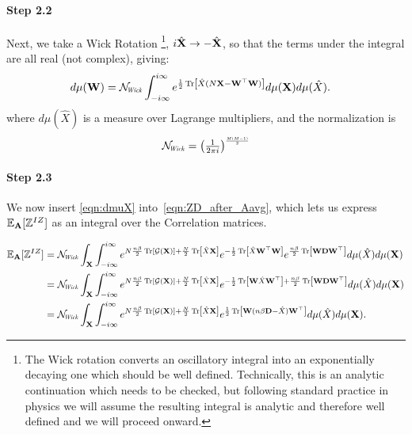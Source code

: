 \paragraph{Step 2.2}
Next, we take a Wick Rotation%
\footnote{The Wick rotation converts an oscillatory integral into an exponentially decaying one which should be well defined.  Technically, this is an analytic continuation which needs to be checked, but following standard practice in physics we will assume the resulting integral is analytic and therefore well defined and we will proceed onward. },
$i\hat{\mathbf{X}}\rightarrow -\hat{\mathbf{X}}$, so that the terms under the integral are all real (not complex), giving:
\begin{align}
  \label{eqn:dmuX}
  d\mu(\mathbf{W}) &= \NWICK\int_{-i\infty}^{i\infty} e^{\frac{1}{2}\Trace{\hat{X}(N\mathbf{X}-\mathbf{W}^{\top}\mathbf{W})}} d\mu(\mathbf{X})d\mu(\hat{X} ).
\end{align}
where $d\mu(\hat{X})$ is a measure over {} Lagrange multipliers, and the normalization is
\begin{equation}
\NWICK = \left(\tfrac{1}{2\pi i}\right)^{\scalebox{0.7}{$\scriptstyle \frac{M(M-1)}{2}$}}
\end{equation}


\paragraph{Step 2.3}
We now insert \ref{eqn:dmuX} into~\ref{eqn:ZD_after_Aavg}, which lets us
express $\mathbb{E}_{\mathbf{A}}[\mathbb{Z}^{IZ}]$ as an integral over the \Teacher Correlation matrices.

\begin{align}
  \nonumber
  \EZDA&=
  \NWICK\int_{\XMAT}  \int_{-i\infty}^{i\infty}
  e^{N\frac{\ND\beta}{2} \Trace{\GFANCY}+\frac{N}{2}\Trace{\hat{X}\mathbf{X}} }
  e^{-\frac{1}{2}\Trace{\hat{X}\mathbf{W}^{\top}\mathbf{W}}}
  e^{\frac{\ND\beta}{2}\Trace{\mathbf{W}\mathbf{D}\mathbf{W}^{\top}}}
  d\mu(\hat{X} )
  d\mu(\mathbf{\XMAT}) \\ 
  \nonumber
  &=
  \NWICK\int_{\XMAT}  \int_{-i\infty}^{i\infty}
  e^{N\frac{\ND\beta}{2}\Trace{\GFANCY}+ \frac{N}{2}\Trace{\hat{X}\mathbf{X}}}
  e^{-\frac{1}{2}\Trace{\mathbf{W}\hat{X}\mathbf{W}^{\top}}+
  \frac{\ND\beta}{2}\Trace{\mathbf{W}\mathbf{D}\mathbf{W}^{\top}}}
  d\mu(\hat{X} )
  d\mu(\mathbf{\XMAT}) \\ 
  \label{eqn:ZD3}
    &=
  \NWICK\int_{\XMAT}  \int_{-i\infty}^{i\infty}
  e^{N\frac{\ND\beta}{2}\Trace{\GFANCY}+
  \frac{N}{2}\Trace{\hat{X}\mathbf{X}}}
  e^{\frac{1}{2}\Trace{\mathbf{W}(\ND\beta\mathbf{D}-\hat{X})\mathbf{W}^{\top}}}
  d\mu(\hat{X} )
  d\mu(\mathbf{\XMAT})  .
\end{align}

